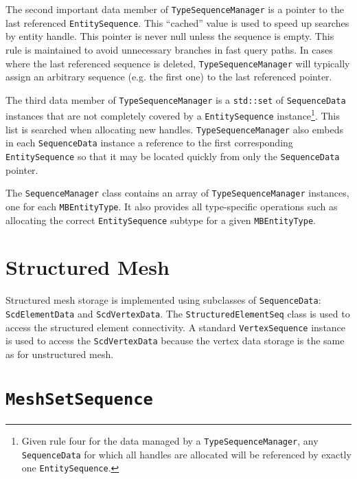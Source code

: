 \documentclass{report}
\begin{document}
The second important data member of \texttt{TypeSequenceManager} is a pointer to the last referenced \texttt{EntitySequence}.  This ``cached'' value is used to speed up searches by entity handle.  This pointer is never null unless the sequence is empty.  This rule is maintained to avoid unnecessary branches in fast query paths.  In cases where the last referenced sequence is deleted, \texttt{TypeSequenceManager} will typically assign an arbitrary sequence (e.g. the first one) to the last referenced pointer.

The third data member of \texttt{TypeSequenceManager} is a \texttt{std::set} of \texttt{SequenceData} instances that are not completely covered by a \texttt{EntitySequence} instance\footnote{Given rule four for the data managed by a \texttt{TypeSequenceManager}, any \texttt{SequenceData} for which all handles are allocated will be referenced by exactly one \texttt{EntitySequence}.}.  This list is searched when allocating new handles.  \texttt{TypeSequenceManager} also embeds in each \texttt{SequenceData} instance a reference to the first corresponding \texttt{EntitySequence} so that it may be located quickly from only the \texttt{SequenceData} pointer.

The \texttt{SequenceManager} class contains an array of \texttt{TypeSequenceManager} instances, one for each \texttt{MBEntityType}.  It also provides all type-specific operations such as allocating the correct \texttt{EntitySequence} subtype for a given \texttt{MBEntityType}.  


\section{Structured Mesh}

Structured mesh storage is implemented using subclasses of \texttt{SequenceData}: \texttt{ScdElementData} and \texttt{ScdVertexData}. The \texttt{StructuredElementSeq} class is used to access the structured element connectivity.  A standard \texttt{VertexSequence} instance is used to access the \texttt{ScdVertexData} because the vertex data storage is the same as for unstructured mesh.

\section{\texttt{MeshSetSequence}}
\end{document}

